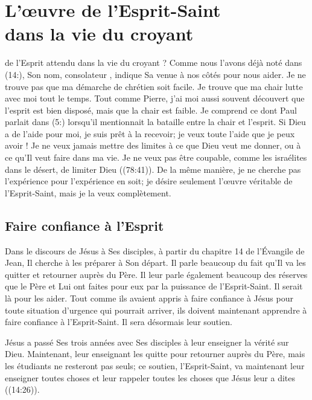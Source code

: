 \chapter[L'œuvre de l'Esprit-Saint dans la vie du croyant]{L'œuvre de l'Esprit-Saint\\ dans la vie du croyant}

 de l'Esprit attendu dans la vie du croyant ?
 Comme nous l'avons déjà noté dans (14:), Son nom,
 \og consolateur \fg{}, indique Sa venue à nos côtés pour nous aider.
 Je ne trouve pas que ma démarche de chrétien soit facile.
 Je trouve que ma chair lutte avec moi tout le temps.
 Tout comme Pierre, j'ai moi aussi souvent découvert que l'esprit
 est bien disposé, mais que la chair est faible.
 Je comprend ce dont Paul parlait dans (5:) lorsqu'il
 mentionnait la bataille entre la chair et l'esprit.
 Si Dieu a de l'aide pour moi, je suis prêt à la recevoir;
 je veux toute l'aide que je peux avoir !
 Je ne veux jamais mettre des limites à ce que Dieu veut me donner,
 ou à ce qu'Il veut faire dans ma vie. Je ne veux pas être coupable,
 comme les israélites dans le désert,
 de limiter Dieu ((78:41)).
 De la même manière, je ne cherche pas l'expérience
 pour l'expérience en soit; je désire seulement l'œuvre véritable
 de l'Esprit-Saint, mais je la veux complètement.

\section*{Faire confiance à l'Esprit}

Dans le discours de Jésus à Ses disciples, à partir du chapitre 14
 de l'Évangile de Jean, Il cherche à les préparer à Son départ.
 Il parle beaucoup du fait qu'Il va les quitter et retourner auprès du Père.
 Il leur parle également beaucoup des réserves que le Père et Lui
 ont faites pour eux par la puissance de l'Esprit-Saint.
 Il serait là pour les aider. Tout comme ils avaient appris à faire confiance
 à Jésus pour toute situation d'urgence qui pourrait arriver,
 ils doivent maintenant apprendre à faire confiance à l'Esprit-Saint.
 Il sera désormais leur soutien.

Jésus a passé Ses trois années avec Ses disciples à leur enseigner
 la vérité sur Dieu. Maintenant, leur enseignant les quitte pour retourner
 auprès du Père, mais les étudiants ne resteront pas seuls;
 ce soutien, l'Esprit-Saint, va maintenant leur enseigner toutes choses
 et leur rappeler toutes les choses que Jésus leur a dites
 ((14:26)).

